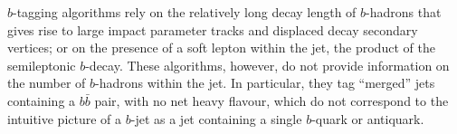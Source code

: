 $b$-tagging algorithms rely on the relatively long decay length of $b$-hadrons that gives rise to large impact parameter tracks and displaced decay secondary vertices; or on the presence of a soft lepton within the jet, the product of the semileptonic $b$-decay.   
These algorithms, however, do not provide information on the number of $b$-hadrons within the jet. In particular, they tag  ``merged'' jets containing a $b\bar{b}$ pair, with no net heavy flavour, which do not correspond to the intuitive picture of a $b$-jet as a jet containing a single $b$-quark or antiquark.






